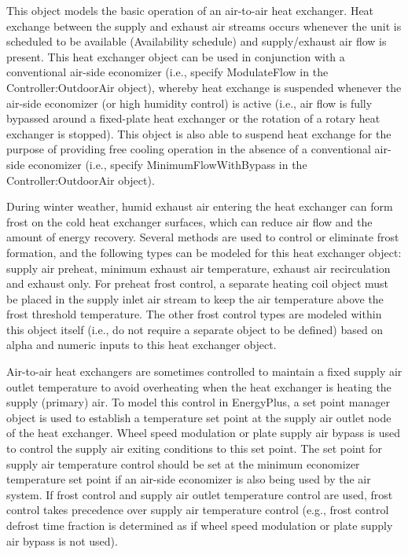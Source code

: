 This object models the basic operation of an air-to-air heat exchanger. Heat exchange between the supply and exhaust air streams occurs whenever the unit is scheduled to be available (Availability schedule) and supply/exhaust air flow is present. This heat exchanger object can be used in conjunction with a conventional air-side economizer (i.e., specify ModulateFlow in the Controller:OutdoorAir object), whereby heat exchange is suspended whenever the air-side economizer (or high humidity control) is active (i.e., air flow is fully bypassed around a fixed-plate heat exchanger or the rotation of a rotary heat exchanger is stopped). This object is also able to suspend heat exchange for the purpose of providing free cooling operation in the absence of a conventional air-side economizer (i.e., specify MinimumFlowWithBypass in the Controller:OutdoorAir object).

During winter weather, humid exhaust air entering the heat exchanger can form frost on the cold heat exchanger surfaces, which can reduce air flow and the amount of energy recovery. Several methods are used to control or eliminate frost formation, and the following types can be modeled for this heat exchanger object: supply air preheat, minimum exhaust air temperature, exhaust air recirculation and exhaust only. For preheat frost control, a separate heating coil object must be placed in the supply inlet air stream to keep the air temperature above the frost threshold temperature. The other frost control types are modeled within this object itself (i.e., do not require a separate object to be defined) based on alpha and numeric inputs to this heat exchanger object.

Air-to-air heat exchangers are sometimes controlled to maintain a fixed supply air outlet temperature to avoid overheating when the heat exchanger is heating the supply (primary) air. To model this control in EnergyPlus, a set point manager object is used to establish a temperature set point at the supply air outlet node of the heat exchanger. Wheel speed modulation or plate supply air bypass is used to control the supply air exiting conditions to this set point. The set point for supply air temperature control should be set at the minimum economizer temperature set point if an air-side economizer is also being used by the air system. If frost control and supply air outlet temperature control are used, frost control takes precedence over supply air temperature control (e.g., frost control defrost time fraction is determined as if wheel speed modulation or plate supply air bypass is not used).

